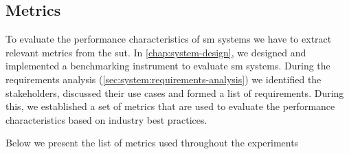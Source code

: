 \subsection{Metrics}
\label{sec:experiments:design:metrics}

To evaluate the performance characteristics of \gls{sm} systems we have to extract relevant metrics from the \gls{sut}. In \cref{chap:system-design}, we designed and implemented a benchmarking instrument to evaluate \gls{sm} systems. During the requirements analysis (\cref{sec:system:requirements-analysis}) we identified the stakeholders, discussed their use cases and formed a list of requirements. During this, we established a set of metrics that are used to evaluate the performance characteristics based on industry best practices.

Below we present the list of metrics used throughout the experiments

